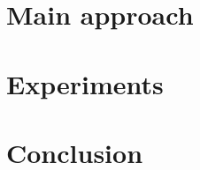 \documentclass[a4paper,10pt]{article}
\begin{document}
\section{Main approach}
\label{main}



\section{Experiments}

\section{Conclusion}

	


\end{document}
